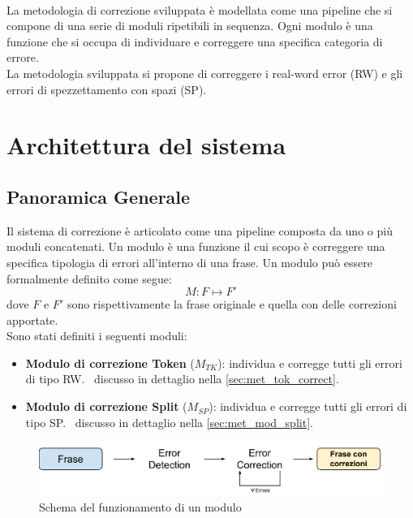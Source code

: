 \ \\
La metodologia di correzione sviluppata è modellata come una pipeline che si compone di una serie di moduli ripetibili in sequenza. Ogni modulo è una funzione che si occupa di individuare e correggere una specifica categoria di errore.\\
La metodologia sviluppata si propone di correggere i real-word error (RW) e gli errori di spezzettamento con spazi (SP).

\section{Architettura del sistema}
\label{sec:met_processo}

\subsection{Panoramica Generale}
\label{sec:met_panoramica}
Il sistema di correzione è articolato come una pipeline composta da uno o più moduli 	concatenati. Un modulo è una funzione il cui scopo è correggere una specifica tipologia di errori all'interno di una frase. Un modulo può essere formalmente definito come segue:
\begin{equation}
M: F \mapsto F\prime
\end{equation}
dove $F$ e $F\prime$ sono rispettivamente la frase originale e quella con delle correzioni apportate. \\
Sono stati definiti i seguenti moduli:
\begin{itemize}
\item \textbf{Modulo di correzione Token} ($M_{TK}$): individua e corregge tutti gli errori di tipo RW. \E\ discusso in dettaglio nella \autoref{sec:met_tok_correct}.
\item \textbf{Modulo di correzione Split} ($M_{SP}$): individua e corregge tutti gli errori di tipo SP. \E\ discusso in dettaglio nella \autoref{sec:met_mod_split}.
\end{itemize}

\begin{figure}[H]
\centering
\includegraphics[width=\textwidth]{immagini/metodologia/modulo}
\caption{Schema del funzionamento di un modulo}
\label{fig:met_modulo}
\end{figure}

